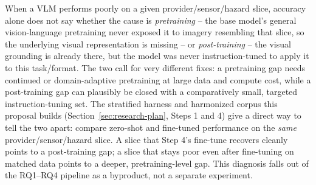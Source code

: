 When a VLM performs poorly on a given provider/sensor/hazard slice, accuracy
alone does not say whether the cause is \emph{pretraining} -- the base
model's general vision-language pretraining never exposed it to imagery
resembling that slice, so the underlying visual representation is missing --
or \emph{post-training} -- the visual grounding is already there, but the
model was never instruction-tuned to apply it to this task/format. The two
call for very different fixes: a pretraining gap needs continued or
domain-adaptive pretraining at large data and compute cost, while a
post-training gap can plausibly be closed with a comparatively small,
targeted instruction-tuning set. The stratified harness and harmonized
corpus this proposal builds (Section~\ref{sec:research-plan}, Steps 1 and 4)
give a direct way to tell the two apart: compare zero-shot and fine-tuned
performance on the \emph{same} provider/sensor/hazard slice. A slice that
Step 4's fine-tune recovers cleanly points to a post-training gap; a slice
that stays poor even after fine-tuning on matched data points to a deeper,
pretraining-level gap. This diagnosis falls out of the RQ1--RQ4 pipeline as
a byproduct, not a separate experiment.
